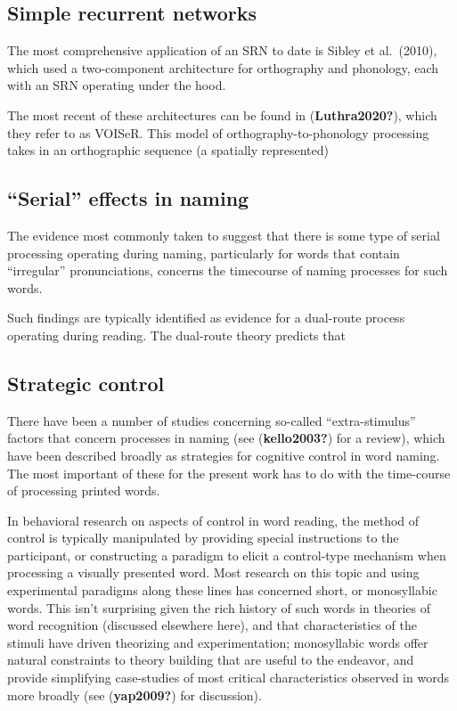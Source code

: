 \documentclass[
  american,
  man,floatsintext]{apa6}
\begin{document}
\hypertarget{simple-recurrent-networks}{%
\subsection{Simple recurrent networks}\label{simple-recurrent-networks}}

The most comprehensive application of an SRN to date is Sibley et al.~(2010), which used a two-component architecture for orthography and phonology, each with an SRN operating under the hood.

The most recent of these architectures can be found in (\textbf{Luthra2020?}), which they refer to as VOISeR. This model of orthography-to-phonology processing takes in an orthographic sequence (a spatially represented)

\hypertarget{serial-effects-in-naming}{%
\subsection{``Serial'' effects in naming}\label{serial-effects-in-naming}}

The evidence most commonly taken to suggest that there is some type of serial processing operating during naming, particularly for words that contain ``irregular'' pronunciations, concerns the timecourse of naming processes for such words.

Such findings are typically identified as evidence for a dual-route process operating during reading. The dual-route theory predicts that

\hypertarget{strategic-control}{%
\subsection{Strategic control}\label{strategic-control}}

There have been a number of studies concerning so-called ``extra-stimulus'' factors that concern processes in naming (see (\textbf{kello2003?}) for a review), which have been described broadly as strategies for cognitive control in word naming. The most important of these for the present work has to do with the time-course of processing printed words.

In behavioral research on aspects of control in word reading, the method of control is typically manipulated by providing special instructions to the participant, or constructing a paradigm to elicit a control-type mechanism when processing a visually presented word. Most research on this topic and using experimental paradigms along these lines has concerned short, or monosyllabic words. This isn't surprising given the rich history of such words in theories of word recognition (discussed elsewhere here), and that characteristics of the stimuli have driven theorizing and experimentation; monosyllabic words offer natural constraints to theory building that are useful to the endeavor, and provide simplifying case-studies of most critical characteristics observed in words more broadly (see (\textbf{yap2009?}) for discussion).
\end{document}
